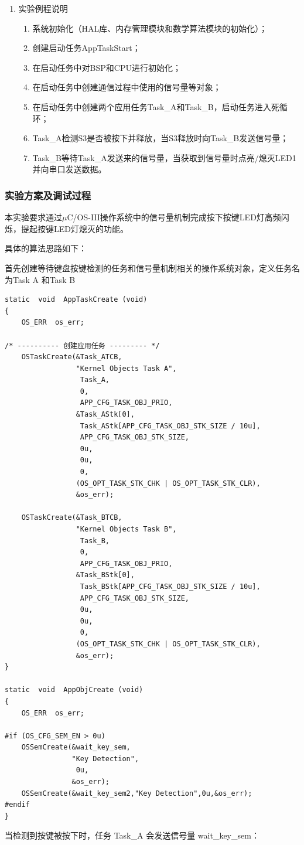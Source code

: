 ﻿\documentclass[UTF8,12pt]{article}
\begin{document}
\begin{enumerate}
  \item 实验例程说明
  \begin{enumerate}
    \item 系统初始化（HAL库、内存管理模块和数学算法模块的初始化）；
    \item 创建启动任务AppTaskStart；
    \item 在启动任务中对BSP和CPU进行初始化；
    \item 在启动任务中创建通信过程中使用的信号量等对象；
    \item 在启动任务中创建两个应用任务Task\_A和Task\_B，启动任务进入死循环；
    \item Task\_A检测S3是否被按下并释放，当S3释放时向Task\_B发送信号量；
    \item Task\_B等待Task\_A发送来的信号量，当获取到信号量时点亮/熄灭LED1并向串口发送数据。
  \end{enumerate}
\end{enumerate}

\subsubsection{实验方案及调试过程}
本实验要求通过$\mu$C/OS-III操作系统中的信号量机制完成按下按键LED灯高频闪烁，提起按键LED灯熄灭的功能。

具体的算法思路如下：

首先创建等待键盘按键检测的任务和信号量机制相关的操作系统对象，定义任务名为Task A 和Task B

\begin{lstlisting}[frame=shadowbox]
  static  void  AppTaskCreate (void)
{
    OS_ERR  os_err;

/* ---------- 创建应用任务 --------- */
    OSTaskCreate(&Task_ATCB,
                 "Kernel Objects Task A",
                  Task_A,
                  0,
                  APP_CFG_TASK_OBJ_PRIO,
                 &Task_AStk[0],
                  Task_AStk[APP_CFG_TASK_OBJ_STK_SIZE / 10u],
                  APP_CFG_TASK_OBJ_STK_SIZE,
                  0u,
                  0u,
                  0,
                 (OS_OPT_TASK_STK_CHK | OS_OPT_TASK_STK_CLR),
                 &os_err);

    OSTaskCreate(&Task_BTCB,
                 "Kernel Objects Task B",
                  Task_B,
                  0,
                  APP_CFG_TASK_OBJ_PRIO,
                 &Task_BStk[0],
                  Task_BStk[APP_CFG_TASK_OBJ_STK_SIZE / 10u],
                  APP_CFG_TASK_OBJ_STK_SIZE,
                  0u,
                  0u,
                  0,
                 (OS_OPT_TASK_STK_CHK | OS_OPT_TASK_STK_CLR),
                 &os_err);
}

static  void  AppObjCreate (void)
{
    OS_ERR  os_err;

#if (OS_CFG_SEM_EN > 0u)
    OSSemCreate(&wait_key_sem,
                "Key Detection",
                 0u,
                &os_err);
    OSSemCreate(&wait_key_sem2,"Key Detection",0u,&os_err);
#endif
}
\end{lstlisting}
当检测到按键被按下时，任务 Task\_A 会发送信号量 wait\_key\_sem：
\end{document}
